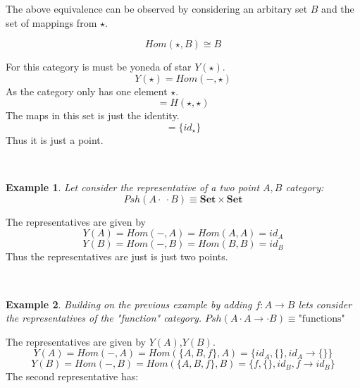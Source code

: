 \documentclass[twoside]{article}
\newtheorem{ex}{Example}[section]
\begin{document}
The above equivalence can be observed by considering an arbitary set $B$
and the set of mappings from $\star$.

$$Hom(\star,B) \cong B $$

For this category is must be yoneda of star $Y(\star)$.
$$Y(\star) = Hom(-,\star)$$
As the category only has one element $\star$.
$$ = H (\star,\star) $$
The maps in this set is just the identity.
$$ = \{ id_{\star } \} $$
Thus it is just a point.\\

\begin{figure}[!h]
  \centering
{}\\
\end{figure}

\begin{ex}
Let consider the representative of a two point $A,B$ category:
$$Psh(A \cdot \: \cdot B ) \equiv \mathbf{Set} \times \mathbf{Set} $$
\end{ex}
The representatives are given by
$$Y(A)=Hom(-,A)=Hom(A,A)=id_{A}$$
$$Y(B)=Hom(-,B)=Hom(B,B)=id_{B}$$
Thus the representatives are just is just two points.\\

\begin{figure}[!h]
  \centering
{}\\
\end{figure}

\begin{ex}
Building on the previous example by adding $f : A \rightarrow B$ lets
consider the representatives of the "function" category.
$Psh(A \cdot A  \rightarrow \cdot B )   \equiv \mbox{"functions"}$\\
\end{ex}
The representatives are given by $Y(A)$,$Y(B)$.
$$Y(A)=Hom(-,A)=Hom(\{A,B,f\},A)=\{id_{A},\{\},id_{A} \rightarrow \{\} \}$$
$$Y(B)=Hom(-,B)=Hom(\{A,B,f\},B)=\{f,\{\},id_{B},f \rightarrow id_{B} \}$$
The second representative has:
\end{document}
